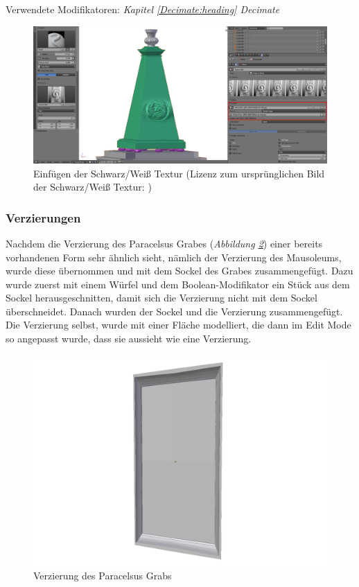 Verwendete Modifikatoren: \textit{Kapitel \ref{Decimate:heading} \dq Decimate\dq}
\begin{figure}[H]
    \centering
    \includegraphics[width=.8\textwidth]{images/Paracelsus-Grab_Brush.png}
    \caption{Einfügen der Schwarz/Weiß Textur (Lizenz zum ursprünglichen Bild der Schwarz/Weiß Textur: \citep{paracelsusgrab:bild})}
    \label{Paracelsus_Grab:image4}
\end{figure}

\subsubsection{Verzierungen}
Nachdem die Verzierung des Paracelsus Grabes (\textit{Abbildung \ref{Paracelsus_Grab:image3}}) einer bereits vorhandenen Form sehr ähnlich sieht, nämlich der Verzierung des Mausoleums, wurde diese übernommen und
mit dem Sockel des Grabes zusammengefügt. Dazu wurde zuerst mit einem Würfel und dem Boolean-Modifikator ein Stück aus dem Sockel herausgeschnitten, damit
sich die Verzierung nicht mit dem Sockel überschneidet. Danach wurden der Sockel und die Verzierung zusammengefügt. Die Verzierung selbst, wurde mit einer
Fläche modelliert, die dann im Edit Mode so angepasst wurde, dass sie aussieht wie eine Verzierung.
\begin{figure}[H]
    \centering
    \includegraphics[width=.8\textwidth]{images/Paracelsus-Grab_Verzierung.png}
    \caption{Verzierung des Paracelsus Grabs}
    \label{Paracelsus_Grab:image3}
\end{figure}

